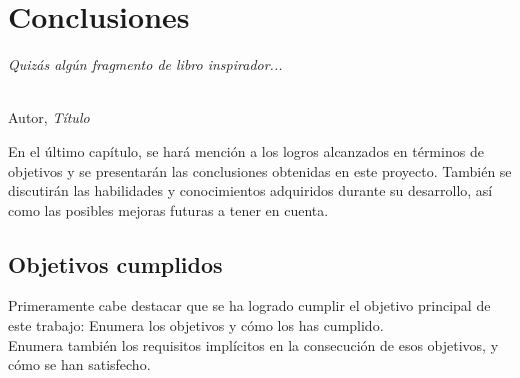 \chapter{Conclusiones}
\label{cap:capitulo7}

\begin{flushright}
\begin{minipage}[]{10cm}
\emph{Quizás algún fragmento de libro inspirador...}\\
\end{minipage}\\

Autor, \textit{Título}\\
\end{flushright}

\vspace{1cm}

\noindent En el último capítulo, se hará mención a los logros alcanzados en términos de objetivos y se presentarán 
las conclusiones obtenidas en este proyecto. También se discutirán las habilidades y conocimientos 
adquiridos durante su desarrollo, así como las posibles mejoras futuras a tener en cuenta.
\section{Objetivos cumplidos}
Primeramente cabe destacar que se ha logrado cumplir el objetivo principal de este trabajo:
Enumera los objetivos y cómo los has cumplido.\\

Enumera también los requisitos implícitos en la consecución de esos objetivos, y cómo se han satisfecho.\\
